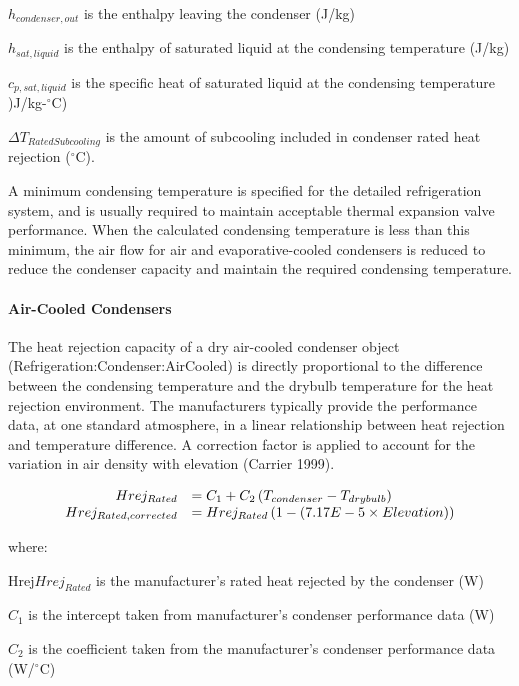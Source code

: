 \(h_{condenser,out}\) is the enthalpy leaving the condenser (J/kg)

\(h_{sat,liquid}\) is the enthalpy of saturated liquid at the condensing temperature (J/kg)

\(c_{p,sat,liquid}\) is the specific heat of saturated liquid at the condensing temperature )J/kg-\(^{\circ}\)C)

\(\Delta T_{RatedSubcooling}\) is the amount of subcooling included in condenser rated heat rejection (\(^{\circ}\)C).

A minimum condensing temperature is specified for the detailed refrigeration system, and is usually required to maintain acceptable thermal expansion valve performance. When the calculated condensing temperature is less than this minimum, the air flow for air and evaporative-cooled condensers is reduced to reduce the condenser capacity and maintain the required condensing temperature.

\paragraph{Air-Cooled Condensers}\label{air-cooled-condensers}

The heat rejection capacity of a dry air-cooled condenser object (Refrigeration:Condenser:AirCooled) is directly proportional to the difference between the condensing temperature and the drybulb temperature for the heat rejection environment. The manufacturers typically provide the performance data, at one standard atmosphere, in a linear relationship between heat rejection and temperature difference. A correction factor is applied to account for the variation in air density with elevation (Carrier 1999).

\begin{equation}
  \begin{array}{rl}
    Hrej_{Rated} &= C_1 + C_2 \left(T_{condenser} - T_{drybulb}\right) \\
    Hrej_{Rated,corrected} &= Hrej_{Rated} \left(1 - \left(7.17E-5 \times Elevation\right)\right)
  \end{array}
\end{equation}

where:

Hrej\(Hrej_{Rated}\) is the manufacturer's rated heat rejected by the condenser (W)

\(C_{1}\) is the intercept taken from manufacturer's condenser performance data (W)

\(C_{2}\) is the coefficient taken from the manufacturer's condenser performance data (W/\(^{\circ}\)C)

